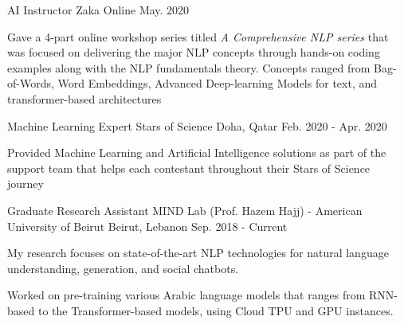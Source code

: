 

\begin{cventries}

  \cventry
    {AI Instructor} %
    {Zaka} %
    {Online} %
    {May. 2020} %
    { 
      \begin{cvitems} %
        \item {Gave a 4-part online workshop series titled \textit{A Comprehensive NLP series} that was focused on delivering the major NLP concepts through hands-on coding examples along with the NLP fundamentals theory. Concepts ranged from Bag-of-Words, Word Embeddings, Advanced Deep-learning Models for text, and transformer-based architectures}
      \end{cvitems}
    }
  \cventry
    {Machine Learning Expert} %
    {Stars of Science} %
    {Doha, Qatar} %
    {Feb. 2020 - Apr. 2020} %
    { 
      \begin{cvitems} %
        \item {Provided Machine Learning and Artificial Intelligence solutions as part of the support team that helps each contestant throughout their Stars of Science journey}
      \end{cvitems}
    }
  \cventry
    {Graduate Research Assistant} %
    {MIND Lab (Prof. Hazem Hajj) - American University of Beirut} %
    {Beirut, Lebanon} %
    {Sep. 2018 - Current} %
    {
      \begin{cvitems} %
        \item {My research focuses on state-of-the-art NLP technologies for natural language understanding, generation, and social chatbots.}
        \item {Worked on pre-training various Arabic language models that ranges from RNN-based to the Transformer-based models, using Cloud TPU and GPU instances.}
      \end{cvitems}
    }


\end{cventries}
